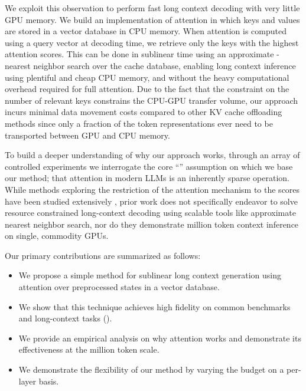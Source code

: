 We exploit this observation to perform fast long context decoding with very little GPU memory. 
We build an implementation of attention in which keys and values are stored in a vector database in CPU memory. 
When attention is computed using a query vector at decoding time, we retrieve only the \kk keys with the highest attention scores. 
This can be done in sublinear time using an approximate \kk-nearest neighbor search over the cache database, enabling long context inference using plentiful and cheap CPU memory, and without the heavy computational overhead required for full attention. Due to the fact that the constraint on the number of relevant keys constrains the CPU-GPU transfer volume, our approach incurs minimal data movement costs compared to other KV cache offloading methods since only a fraction of the token representations ever need to be transported between GPU and CPU memory.

To build a deeper understanding of why our approach works, through an array of controlled experiments we interrogate the core ``\topk'' assumption on which we base our method; that attention in modern LLMs is an inherently sparse operation. 
While methods exploring the restriction of the attention mechanism to the \topk scores have been studied extensively \citep{guptaMemoryefficientTransformersTopk2021, liu2024retrievalattentionacceleratinglongcontextllm, zhang2024pqcacheproductquantizationbasedkvcache}, 
prior work does not specifically endeavor to solve resource constrained long-context decoding using scalable tools like approximate nearest neighbor search, nor do they demonstrate million token context inference on single, commodity GPUs.


Our primary contributions are summarized as follows:
\begin{itemize}[topsep=0.0cm,itemsep=-0.2cm,leftmargin=0.5cm]
    \item We propose a simple method for sublinear long context generation using \topk attention over preprocessed states in a vector database.
    \item We show that this technique achieves high fidelity on common benchmarks and long-context tasks ().
    \item We provide an empirical analysis on why \topk attention works and demonstrate its effectiveness at the million token scale.
    \item We demonstrate the flexibility of our method by varying the \topk budget on a per-layer basis.
\end{itemize}

